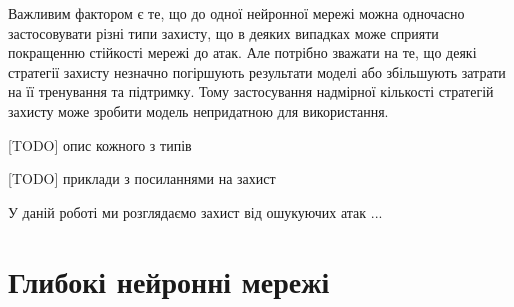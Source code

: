 \documentclass[14pt,a4paper]{extarticle}
\newcounter{e}
\numberwithin{equation}{section}
\numberwithin{figure}{section}
\begin{document}
 Важливим фактором є те, що до одної нейронної мережі можна одночасно застосовувати різні типи захисту, що в деяких випадках може сприяти покращенню стійкості мережі до атак. Але потрібно зважати на те, що деякі стратегії захисту незначно погіршують результати моделі або збільшують затрати на її тренування та підтримку. Тому застосування надмірної кількості стратегій захисту може зробити модель непридатною для використання.
 
 [TODO] опис кожного з типів
 
 [TODO] приклади з посиланнями на захист
 
 
 У даній роботі ми розглядаємо захист від ошукуючих атак ...
 
 
 \newpage
 \thispagestyle{empty}
 \section{Глибокі нейронні мережі}
 
\end{document}
